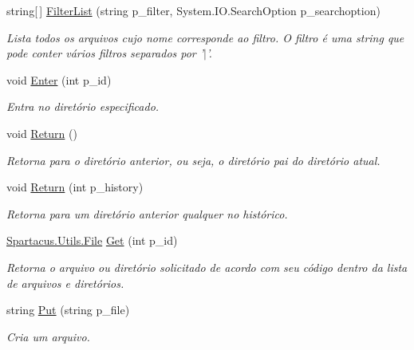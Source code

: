 \begin{DoxyCompactItemize}
string\mbox{[}$\,$\mbox{]} \hyperlink{classSpartacus_1_1Utils_1_1FileExplorer_a1af76e64b4bb7ff7075179c881c08b71}{Filter\+List} (string p\+\_\+filter, System.\+I\+O.\+Search\+Option p\+\_\+searchoption)
\begin{DoxyCompactList}\small\item\em Lista todos os arquivos cujo nome corresponde ao filtro. O filtro é uma string que pode conter vários filtros separados por '$\vert$'. \end{DoxyCompactList}\item 
void \hyperlink{classSpartacus_1_1Utils_1_1FileExplorer_ac9273b0e7cd1365d67c60b9255e6f538}{Enter} (int p\+\_\+id)
\begin{DoxyCompactList}\small\item\em Entra no diretório especificado. \end{DoxyCompactList}\item 
void \hyperlink{classSpartacus_1_1Utils_1_1FileExplorer_a79d43d93289567d3d0544d9c7b61949e}{Return} ()
\begin{DoxyCompactList}\small\item\em Retorna para o diretório anterior, ou seja, o diretório pai do diretório atual. \end{DoxyCompactList}\item 
void \hyperlink{classSpartacus_1_1Utils_1_1FileExplorer_a8c597465a98c123bf84b83126d06e6b0}{Return} (int p\+\_\+history)
\begin{DoxyCompactList}\small\item\em Retorna para um diretório anterior qualquer no histórico. \end{DoxyCompactList}\item 
\hyperlink{classSpartacus_1_1Utils_1_1File}{Spartacus.\+Utils.\+File} \hyperlink{classSpartacus_1_1Utils_1_1FileExplorer_a75222d9146d14fb15e5fe46b0fa1f3c9}{Get} (int p\+\_\+id)
\begin{DoxyCompactList}\small\item\em Retorna o arquivo ou diretório solicitado de acordo com seu código dentro da lista de arquivos e diretórios. \end{DoxyCompactList}\item 
string \hyperlink{classSpartacus_1_1Utils_1_1FileExplorer_ad6f65e809b0c424f639dde8d6fd5d85f}{Put} (string p\+\_\+file)
\begin{DoxyCompactList}\small\item\em Cria um arquivo. \end{DoxyCompactList}\item 

\end{DoxyCompactItemize}
